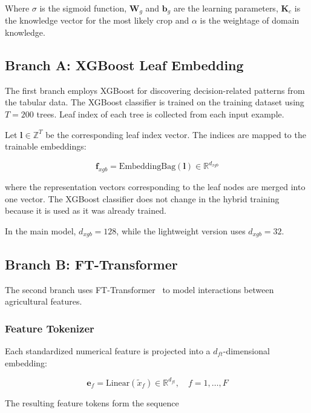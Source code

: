 \documentclass[journal]{IEEEtran}
\begin{document}
Where $\sigma$ is the sigmoid function, $\mathbf{W}_g$ and $\mathbf{b}_g$ are the learning parameters, $\mathbf{K}_c$ is the knowledge vector for the most likely crop and $\alpha$ is the weightage of domain knowledge.

\subsection{Branch A: XGBoost Leaf Embedding}

The first branch employs XGBoost for discovering decision-related patterns from the tabular data. The XGBoost classifier is trained on the training dataset using $T=200$ trees. Leaf index of each tree is collected from each input example.

Let $\mathbf{l}\in\mathbb{Z}^{T}$ be the corresponding leaf index vector. The indices are mapped to the trainable embeddings:

\begin{equation}
\mathbf{f}_{xgb} =
\text{EmbeddingBag}(\mathbf{l})
\in\mathbb{R}^{d_{xgb}}
\end{equation}

where the representation vectors corresponding to the leaf nodes are merged into one vector. The XGBoost classifier does not change in the hybrid training because it is used as it was already trained.

In the main model, $d_{xgb}=128$, while the lightweight version uses $d_{xgb}=32$.

\subsection{Branch B: FT-Transformer}

The second branch uses FT-Transformer~\cite{gorishniy2021revisiting} to model interactions between agricultural features.

\subsubsection{Feature Tokenizer}

Each standardized numerical feature is projected into a $d_{ft}$-dimensional embedding:

\begin{equation}
\mathbf{e}_f =
\text{Linear}(\tilde{x}_f)
\in\mathbb{R}^{d_{ft}},
\quad f=1,\ldots,F
\end{equation}

The resulting feature tokens form the sequence
\end{document}
